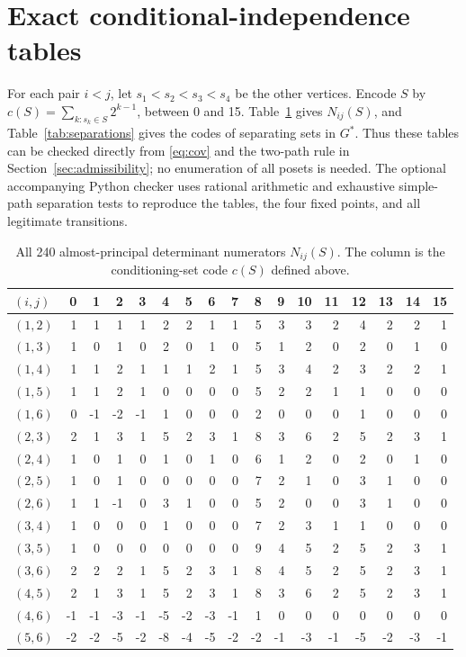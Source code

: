 \documentclass[11pt]{article}
\begin{document}
\section{Exact conditional-independence tables}\label{app:tables}
For each pair $i<j$, let $s_1<s_2<s_3<s_4$ be the other vertices.
Encode $S$ by $c(S)=\sum_{k:s_k\in S}2^{k-1}$, between 0 and 15.
Table~\ref{tab:minors} gives $N_{ij}(S)$, and
Table~\ref{tab:separations} gives the codes of separating sets in $G^*$.
Thus these tables can be checked directly from \eqref{eq:cov} and the
two-path rule in Section~\ref{sec:admissibility}; no enumeration of all
posets is needed. The optional accompanying Python checker uses rational
arithmetic and exhaustive simple-path separation tests to reproduce the
tables, the four fixed points, and all legitimate transitions.
\begin{table}[!ht]
\centering\small\setlength{\tabcolsep}{3pt}
\begin{tabular}{@{}lrrrrrrrrrrrrrrrr@{}}\toprule
$(i,j)$&0&1&2&3&4&5&6&7&8&9&10&11&12&13&14&15\\\midrule
$(1,2)$&1&1&1&1&2&2&1&1&5&3&3&2&4&2&2&1\\
$(1,3)$&1&0&1&0&2&0&1&0&5&1&2&0&2&0&1&0\\
$(1,4)$&1&1&2&1&1&1&2&1&5&3&4&2&3&2&2&1\\
$(1,5)$&1&1&2&1&0&0&0&0&5&2&2&1&1&0&0&0\\
$(1,6)$&0&-1&-2&-1&1&0&0&0&2&0&0&0&1&0&0&0\\
$(2,3)$&2&1&3&1&5&2&3&1&8&3&6&2&5&2&3&1\\
$(2,4)$&1&0&1&0&1&0&1&0&6&1&2&0&2&0&1&0\\
$(2,5)$&1&0&1&0&0&0&0&0&7&2&1&0&3&1&0&0\\
$(2,6)$&1&1&-1&0&3&1&0&0&5&2&0&0&3&1&0&0\\
$(3,4)$&1&0&0&0&1&0&0&0&7&2&3&1&1&0&0&0\\
$(3,5)$&1&0&0&0&0&0&0&0&9&4&5&2&5&2&3&1\\
$(3,6)$&2&2&2&1&5&2&3&1&8&4&5&2&5&2&3&1\\
$(4,5)$&2&1&3&1&5&2&3&1&8&3&6&2&5&2&3&1\\
$(4,6)$&-1&-1&-3&-1&-5&-2&-3&-1&1&0&0&0&0&0&0&0\\
$(5,6)$&-2&-2&-5&-2&-8&-4&-5&-2&-2&-1&-3&-1&-5&-2&-3&-1\\
\bottomrule\end{tabular}
\caption{All 240 almost-principal determinant numerators $N_{ij}(S)$.
The column is the conditioning-set code $c(S)$ defined above.}
\label{tab:minors}\end{table}
\end{document}
